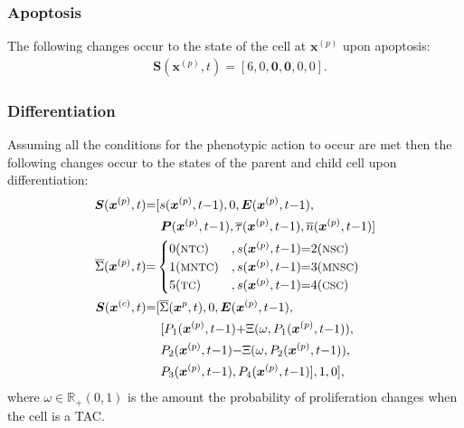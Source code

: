 \documentclass[\main/thesis.tex]{subfiles}
\begin{document}
\subsubsection{Apoptosis}
The following changes occur to the state of the cell at $\boldsymbol{x}^{(p)}$ upon apoptosis:
\begin{align}
&\boldsymbol{S}(\boldsymbol{x}^{(p)}, t) {=} [ 6, 0, \boldsymbol{0}, \boldsymbol{0}, 0, 0 ].
\label{eq:ApoptosisStateChange}
\end{align}

\subsubsection{Differentiation}
Assuming all the conditions for the phenotypic action to occur are met then the  
following changes occur to the states of the parent and child cell upon differentiation:
\begin{align}
\boldsymbol{S}(\boldsymbol{x}^{(p)}, t) &{=} [ s(\boldsymbol{x}^{(p)}, t{-}1), 0, 
                                               \boldsymbol{E}(\boldsymbol{x}^{(p)}, t{-}1),
                                               \label{eq:DifferentiationStateChangeParent}\\
                                               &\hspace{0.4cm} \boldsymbol{P}(\boldsymbol{x}^{(p)}, t{-}1), \overline{\tau}(\boldsymbol{x}^{(p)}, t{-}1), 
                                               \overline{n}(\boldsymbol{x}^{(p)}, t{-}1) ]
\nonumber\\
\overline{\Sigma}(\boldsymbol{x}^{(p)}, t) &{=} \begin{cases}
	0 (\text{{\footnotesize NTC}}) &, s(\boldsymbol{x}^{(p)}, t{-}1) {=} 2 (\text{{\footnotesize NSC}})\\
    1 (\text{{\footnotesize MNTC}}) &, s(\boldsymbol{x}^{(p)}, t{-}1) {=} 3 (\text{{\footnotesize MNSC}})\\
    5 (\text{{\footnotesize TC}}) &, s(\boldsymbol{x}^{(p)}, t{-}1) {=} 4 (\text{{\footnotesize CSC}})
  \end{cases} \label{eq:SCChildIndicatorFunction}\\
\boldsymbol{S}(\boldsymbol{x}^{(c)}, t) &{=} 
                     [ \overline{\Sigma}(\boldsymbol{x}^p, t), 0, 
                       \boldsymbol{E}(\boldsymbol{x}^{(p)}, t{-}1), \label{eq:DifferentiationStateChangeChild}\\
                       &\hspace{0.4cm} [ P_1(\boldsymbol{x}^{(p)}, t{-}1) {+} \Xi(\omega, P_1(\boldsymbol{x}^{(p)}, t{-}1)),\nonumber\\
                       &\hspace{0.4cm} P_2(\boldsymbol{x}^{(p)}, t{-}1) {-} \Xi(\omega, P_2(\boldsymbol{x}^{(p)}, t{-}1)),\nonumber \\
                       &\hspace{0.4cm} P_3(\boldsymbol{x}^{(p)}, t{-}1), P_4(\boldsymbol{x}^{(p)}, t{-}1) ], 1, 0 ]
\nonumber,
\end{align}
where $\omega {\in} \mathbb{R}_+(0, 1)$ is the amount the probability of proliferation changes when 
the cell is a TAC.
\end{document}
